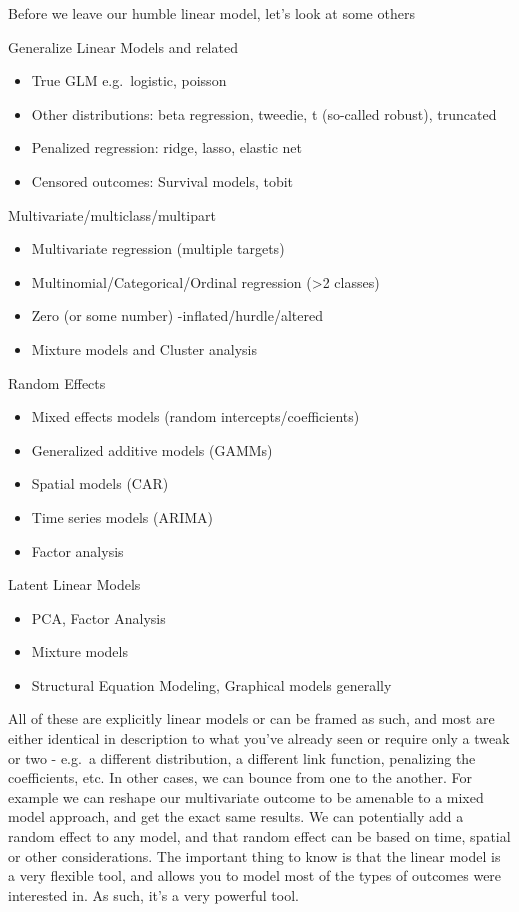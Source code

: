 \documentclass[
  letterpaper,
]{krantz}
\providecommand{\tightlist}{%
  \setlength{\itemsep}{0pt}\setlength{\parskip}{0pt}}\usepackage{longtable,booktabs,array}
\begin{document}
Before we leave our humble linear model, let's look at some others

Generalize Linear Models and related

\begin{itemize}
\tightlist
\item
  True GLM e.g.~logistic, poisson
\item
  Other distributions: beta regression, tweedie, t (so-called robust),
  truncated
\item
  Penalized regression: ridge, lasso, elastic net
\item
  Censored outcomes: Survival models, tobit
\end{itemize}

Multivariate/multiclass/multipart

\begin{itemize}
\tightlist
\item
  Multivariate regression (multiple targets)
\item
  Multinomial/Categorical/Ordinal regression (\textgreater2 classes)
\item
  Zero (or some number) -inflated/hurdle/altered
\item
  Mixture models and Cluster analysis
\end{itemize}

Random Effects

\begin{itemize}
\tightlist
\item
  Mixed effects models (random intercepts/coefficients)
\item
  Generalized additive models (GAMMs)
\item
  Spatial models (CAR)
\item
  Time series models (ARIMA)
\item
  Factor analysis
\end{itemize}

Latent Linear Models

\begin{itemize}
\tightlist
\item
  PCA, Factor Analysis
\item
  Mixture models
\item
  Structural Equation Modeling, Graphical models generally
\end{itemize}

All of these are explicitly linear models or can be framed as such, and
most are either identical in description to what you've already seen or
require only a tweak or two - e.g.~a different distribution, a different
link function, penalizing the coefficients, etc. In other cases, we can
bounce from one to the another. For example we can reshape our
multivariate outcome to be amenable to a mixed model approach, and get
the exact same results. We can potentially add a random effect to any
model, and that random effect can be based on time, spatial or other
considerations. The important thing to know is that the linear model is
a very flexible tool, and allows you to model most of the types of
outcomes were interested in. As such, it's a very powerful tool.
\end{document}
